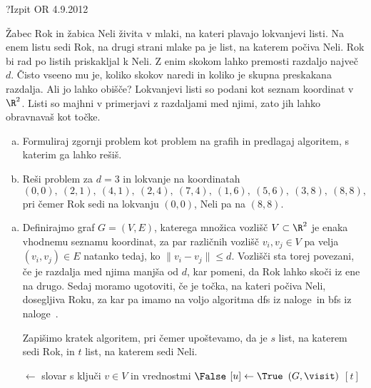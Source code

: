\begin{naloga}{?}{Izpit OR 4.9.2012}
\begin{vprasanje}
Žabec Rok in žabica Neli živita v mlaki,
na kateri plavajo lokvanjevi listi.
Na enem listu sedi Rok,
na drugi strani mlake pa je list, na katerem počiva Neli.
Rok bi rad po listih priskakljal k Neli.
Z enim skokom lahko premosti razdaljo največ $d$.
Čisto vseeno mu je, koliko skokov naredi
in koliko je skupna preskakana razdalja.
Ali jo lahko obišče?
Lokvanjevi listi so podani kot seznam koordinat v $\R^2$.
Listi so majhni v primerjavi z razdaljami med njimi,
zato jih lahko obravnavaš kot točke.

\begin{enumerate}[(a)]
\item Formuliraj zgornji problem kot problem na grafih in predlagaj algoritem,
s katerim ga lahko rešiš.

\item Reši problem za $d = 3$ in lokvanje na koordinatah
$$
(0, 0), \ (2, 1), \ (4, 1), \ (2, 4), \ (7, 4),
\ (1, 6), \ (5, 6), \ (3, 8), \ (8, 8),
$$
pri čemer Rok sedi na lokvanju $(0, 0)$, Neli pa na $(8, 8)$.
\end{enumerate}
\end{vprasanje}

\begin{odgovor}
\begin{enumerate}[(a)]
\item Definirajmo graf $G = (V, E)$,
katerega množica vozlišč $V \subset \R^2$
je enaka vhod\-nemu seznamu koordinat,
za par različnih vozlišč $v_i, v_j \in V$
pa velja $(v_i, v_j) \in E$ natanko tedaj,
ko $\|v_i - v_j\|  \leq d$.
Vozlišči sta torej povezani, če je razdalja med njima manjša od $d$,
kar pomeni, da Rok lahko skoči iz ene na drugo.
Sedaj moramo ugotoviti, če je točka, na kateri počiva Neli, dosegljiva Roku, 
za kar pa imamo na voljo algoritma {\sc dfs} iz naloge~\res[dfs]
in {\sc bfs} iz naloge~\res[bfs].

Zapišimo kratek algoritem, pri čemer upoštevamo, da je $s$ list, na katerem sedi Rok, in $t$ list, na katerem sedi Neli.
\begin{small}
\begin{algorithmic}
	 $\gets$ slovar s ključi $v \in V$
                                 in vrednostmi $\False$
		$[u] \gets \True$
	\EndFunction
	$(G, \visit)$
	\State {}$[t]$
\EndFunction
\end{algorithmic}
\end{small}


\end{enumerate}
\end{odgovor}
\end{naloga}
